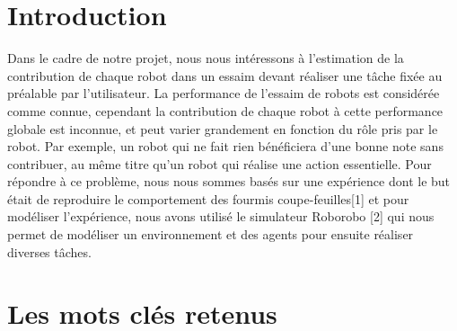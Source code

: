 \documentclass[11pt]{article}
\begin{document}
\begin{flushleft}
\section{Introduction}
Dans le cadre de notre projet, nous nous intéressons à l’estimation de la contribution de chaque robot dans un essaim devant réaliser une tâche fixée au préalable par l’utilisateur. La performance de l’essaim de robots est considérée comme connue, cependant la contribution de chaque robot à cette performance globale est inconnue, et peut varier grandement en fonction du rôle pris par le robot. Par exemple, un robot qui ne fait rien bénéficiera d’une bonne note sans contribuer, au même titre qu’un robot qui réalise une action essentielle. Pour répondre à ce problème, nous nous sommes basés sur une expérience dont le but était de reproduire le comportement des fourmis coupe-feuilles[1] et pour modéliser l’expérience, nous avons utilisé le simulateur Roborobo [2] qui nous permet de modéliser un environnement et des agents pour ensuite réaliser diverses tâches. 


\section{Les mots clés retenus}




\end{flushleft}
\end{document}

